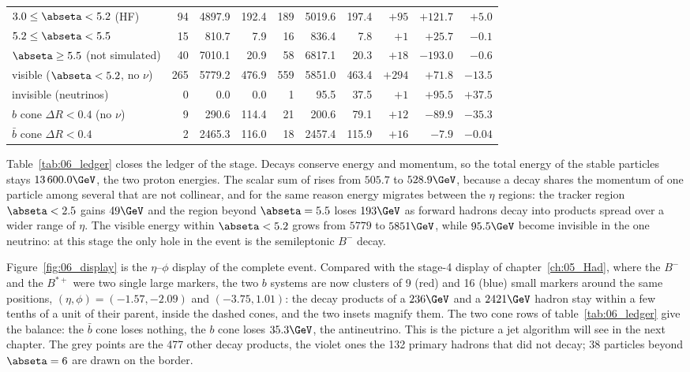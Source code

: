 \begin{table}[htbp]
\begin{tabular}{@{}lrrrrrrrrr@{}}
$3.0 \le \abseta < 5.2$ (HF)     &  94 & 4897.9 & 192.4 & 189 & 5019.6 & 197.4 & $+95$  & $+121.7$ & $+5.0$ \\
$5.2 \le \abseta < 5.5$          &  15 &  810.7 &   7.9 &  16 &  836.4 &   7.8 & $+1$   & $+25.7$  & $-0.1$ \\
$\abseta \ge 5.5$ (not simulated) & 40 & 7010.1 &  20.9 &  58 & 6817.1 &  20.3 & $+18$  & $-193.0$ & $-0.6$ \\
\midrule
visible ($\abseta < 5.2$, no $\nu$) & 265 & 5779.2 & 476.9 & 559 & 5851.0 & 463.4 & $+294$ & $+71.8$ & $-13.5$ \\
invisible (neutrinos)               &   0 &    0.0 &   0.0 &   1 &   95.5 &  37.5 & $+1$   & $+95.5$ & $+37.5$ \\
\midrule
$b$ cone $\Delta R<0.4$ (no $\nu$)       &   9 &  290.6 & 114.4 &  21 &  200.6 &  79.1 & $+12$  & $-89.9$ & $-35.3$ \\
$\bar b$ cone $\Delta R<0.4$             &   2 & 2465.3 & 116.0 &  18 & 2457.4 & 115.9 & $+16$  & $-7.9$  & $-0.04$ \\
\bottomrule
\end{tabular}
\end{table}

Table~\ref{tab:06_ledger} closes the ledger of the stage. Decays conserve energy and momentum, so the total energy
of the stable particles stays $13\,600.0\GeV$, the two proton energies. The scalar sum of \pt{} rises from
$505.7$ to $528.9\GeV$, because a decay shares the momentum of one particle among several that are not
collinear, and for the same reason energy migrates between the $\eta$ regions: the tracker region
$\abseta < 2.5$ gains $49\GeV$ and the region beyond $\abseta = 5.5$ loses $193\GeV$ as forward hadrons decay
into products spread over a wider range of $\eta$. The visible energy within $\abseta < 5.2$ grows from $5779$
to $5851\GeV$, while $95.5\GeV$ become invisible in the one neutrino: at this stage the only hole in the event
is the semileptonic $B^-$ decay.

Figure~\ref{fig:06_display} is the $\eta$--$\phi$ display of the complete event. Compared with the stage-4
display of chapter~\ref{ch:05_Had}, where the $B^-$ and the $B^{*+}$ were two single large markers, the two
$b$ systems are now clusters of 9 (red) and 16 (blue) small markers around the same positions, $(\eta, \phi) =
(-1.57, -2.09)$ and $(-3.75, 1.01)$: the decay products of a $236\GeV$ and a $2421\GeV$ hadron stay within a
few tenths of a unit of their parent, inside the dashed cones, and the two insets magnify them. The two cone rows
of table~\ref{tab:06_ledger} give the balance: the $\bar b$ cone loses nothing, the $b$ cone loses $35.3\GeV$,
the antineutrino. This is the picture a jet algorithm will see in the next chapter. The
grey points are the 477 other decay products, the violet ones the 132 primary hadrons that did not decay; 38
particles beyond $\abseta = 6$ are drawn on the border.

